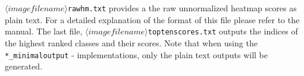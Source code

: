 \documentclass[a4wide]{article}
\begin{document}
\begin{itemize}
\begin{itemize}
\texttt{$\langle imagefilename\rangle$\textunderscore rawhm.txt} provides a the raw unnormalized heatmap scores as plain text. For a detailed explanation of the format of this file please refer to the manual. The last file, \texttt{$\langle imagefilename\rangle$\textunderscore toptenscores.txt} outputs the indices of the highest ranked classes and their scores.
Note that when using the \texttt{*\_minimaloutput} - implementations, only the plain text outputs will be generated.	
			\end{itemize}
\end{itemize}
\end{document}
